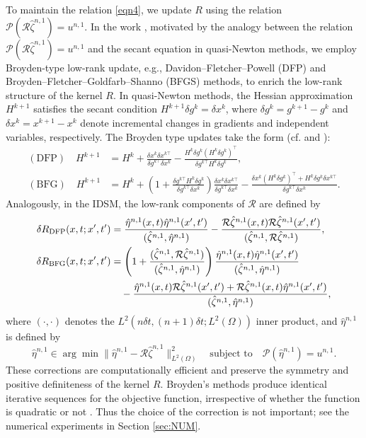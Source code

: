 \documentclass[onefignum,onetabnum]{siamart190516}
\numberwithin{equation}{section}
\begin{document}
To maintain the relation \eqref{eqn4}, we update $R$ using the relation $\mathcal{P}(\mathcal{R} \hat{\zeta}^{n,1}) = u^{n,1}$.
In the work \cite{Ito2025Iterative}, motivated by the analogy between the relation $\mathcal{P}(\mathcal{R} \hat{\zeta}^{n,1}) = u^{n,1}$ and the secant equation in quasi-Newton methods, we employ Broyden-type low-rank update, e.g., Davidon–Fletcher–Powell (DFP) and Broyden–Fletcher–Goldfarb–Shanno (BFGS) methods, to enrich the low-rank structure of the kernel ${R}$. In quasi-Newton methods, the Hessian approximation $H^{k+1}$ satisfies the secant condition $H^{k+1}\delta g^{k} = \delta x^{k}$, where $\delta g^{k} = g^{k+1} - g^{k}$ and $\delta x^{k} = x^{k+1} - x^{k}$ denote incremental changes in gradients and independent variables, respectively.
The Broyden type updates take the form (cf. \cite[p. 149]{Wright2006} and \cite[p. 169]{Schnabel1996}):
\begin{align*}
(\text{DFP})\quad H^{k+1} &= H^{k} + \frac{\delta x^{k} \delta x^{k\top}}{\delta g^{k\top} \delta x^{k}} - \frac{H^{k} \delta g^{k} (H^{k}\delta g^{k})^\top }{\delta g^{k\top} H^{k} \delta g^{k}} ,\\
(\text{BFG})\quad H^{k+1} &= H^k + \left(1+\frac{\delta g^{k\top}H^{k}\delta g^{k}}{\delta g^{k\top} \delta x^k}\right) \frac{\delta x^k \delta x^{k\top}}{\delta g^{k\top} \delta x^k} - \frac{\delta x^k (H^k\delta g^k)^\top + H^k \delta g^k \delta x^{k\top}}{\delta g^{k\top} \delta x^k}.
\end{align*}
Analogously, in the IDSM, the low-rank components of $\mathcal{R}$ are defined by
\begin{align}
\delta R_{\rm DFP}(x,t;x',t') &= \frac{\hat{\eta}^{n,1}(x,t)\hat{\eta}^{n,1}(x',t')}{(\hat{\zeta}^{n,1},\hat{\eta}^{n,1})}-\frac{\mathcal{R}\hat{\zeta}^{n,1}(x,t)\mathcal{R}\hat{\zeta}^{n,1}(x',t')}{(\hat{\zeta}^{n,1},\mathcal{R}\hat{\zeta}^{n,1})},\label{eqn:DFP}\\
\delta R_{\rm BFG}(x,t;x',t') &= \left(1+\frac{(\hat{\zeta}^{n,1},\mathcal{R}\hat{\zeta}^{n,1})}{(\hat{\zeta}^{n,1}, \hat{\eta}^{n,1})}\right)\frac{\hat{\eta}^{n,1}(x,t)\hat{\eta}^{n,1}(x',t')}{(\hat{\zeta}^{n,1}, \hat{\eta}^{n,1})} \nonumber \\
&\quad -\frac{\hat{\eta}^{n,1}(x,t)\mathcal{R}\hat{\zeta}^{n,1}(x',t') + \mathcal{R}\hat{\zeta}^{n,1}(x,t)\hat{\eta}^{n,1}(x',t')}{(\hat{\zeta}^{n,1}, \hat{\eta}^{n,1})},\label{eqn:BFG}
\end{align}
where $(\cdot, \cdot)$ denotes the $L^{2}(n\delta t, (n+1)\delta t; L^{2}(\Omega))$ inner product, and $\hat{\eta}^{n,1}$ is defined by
\begin{equation}\label{eqn20}
\hat{\eta}^{n,1}\in\arg\min\|\hat{\eta}^{n,1}-\mathcal{R}\hat{\zeta}^{n,1}\|_{L^2(\Omega)}^{2} \quad \text{subject to} \quad \mathcal{P}(\hat{\eta}^{n,1})=u^{n,1}.
\end{equation}
These corrections are computationally efficient \cite[Chapter 6]{Wright2006} and preserve the symmetry and positive definiteness of the kernel $R$. Broyden's methods produce identical iterative sequences for the objective function, irrespective of whether the function is quadratic or not \cite[Theorem 8.2.2]{Schnabel1996}.
Thus the choice of the correction is not important; see the numerical experiments in Section \ref{sec:NUM}.
\end{document}
